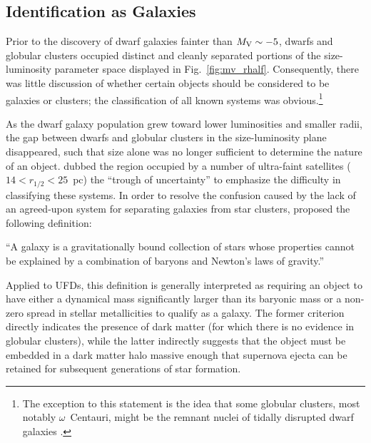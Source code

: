 \documentclass[a4paper]{ar-1col}
\begin{document}
\subsection{Identification as Galaxies}
\label{sec:galaxies}

Prior to the discovery of dwarf galaxies fainter than $M_{{\rm V}}
\sim -5$, dwarfs and globular clusters occupied distinct and cleanly
separated portions of the size-luminosity parameter space displayed in
Fig.~\ref{fig:mv_rhalf}.  Consequently, there was little discussion of
whether certain objects should be considered to be galaxies or
clusters; the classification of all known systems was
obvious.\footnote{The exception to this statement is the idea that
  some globular clusters, most notably $\omega$~Centauri, might be the
  remnant nuclei of tidally disrupted dwarf galaxies
  \citep[e.g.,][]{lee99,majewski00,hr00}.}

As the dwarf galaxy population grew toward lower luminosities and
smaller radii, the gap between dwarfs and globular clusters in the
size-luminosity plane disappeared, such that size alone was no longer
sufficient to determine the nature of an object.  \citet{conn18}
dubbed the region occupied by a number of ultra-faint satellites ($14
< r_{1/2} < 25$~pc) the ``trough of uncertainty'' to emphasize the
difficulty in classifying these systems.  In order to resolve the
confusion caused by the lack of an agreed-upon system for separating
galaxies from star clusters, \citet{ws12} proposed the following
definition: 

\begin{extract}
``A galaxy is a gravitationally bound collection of stars
whose properties cannot be explained by a combination of baryons and
Newton's laws of gravity.'' 
\end{extract}

\noindent
Applied to UFDs, this definition is generally interpreted as requiring
an object to have either a dynamical mass significantly larger than
its baryonic mass or a non-zero spread in stellar metallicities to
qualify as a galaxy.  The former criterion directly indicates the
presence of dark matter (for which there is no evidence in globular
clusters), while the latter indirectly suggests that the object must
be embedded in a dark matter halo massive enough that supernova ejecta
can be retained for subsequent generations of star formation.
\end{document}
